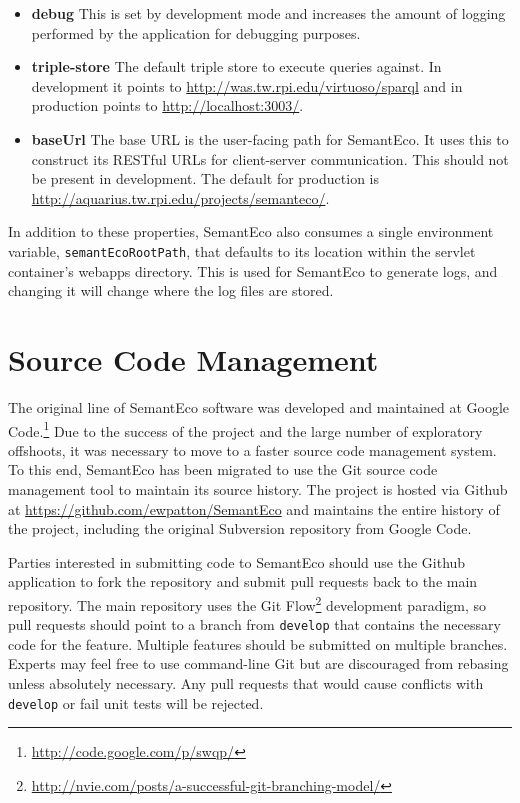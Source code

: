 \documentclass[letterpaper]{report}
\begin{document}
\begin{itemize}
\item \textbf{debug} This is set by development mode and increases the amount of logging performed by the application for debugging purposes.
\item \textbf{triple-store} The default triple store to execute queries against. In development it points to \url{http://was.tw.rpi.edu/virtuoso/sparql} and in production points to \url{http://localhost:3003/}.
\item \textbf{baseUrl} The base URL is the user-facing path for SemantEco. It uses this to construct its RESTful URLs for client-server communication. This should not be present in development. The default for production is \url{http://aquarius.tw.rpi.edu/projects/semanteco/}.
\end{itemize}

In addition to these properties, SemantEco also consumes a single environment variable, \texttt{semantEcoRootPath}, that defaults to its location within the servlet container's webapps directory. This is used for SemantEco to generate logs, and changing it will change where the log files are stored.

\chapter{Source Code Management}
The original line of SemantEco software was developed and maintained at Google Code.\footnote{\url{http://code.google.com/p/swqp/}} Due to the success of the project and the large number of exploratory offshoots, it was necessary to move to a faster source code management system. To this end, SemantEco has been migrated to use the Git source code management tool to maintain its source history. The project is hosted via Github at \url{https://github.com/ewpatton/SemantEco} and maintains the entire history of the project, including the original Subversion repository from Google Code.

Parties interested in submitting code to SemantEco should use the Github application to fork the repository and submit pull requests back to the main repository. The main repository uses the Git Flow\footnote{\url{http://nvie.com/posts/a-successful-git-branching-model/}} development paradigm, so pull requests should point to a branch from \texttt{develop} that contains the necessary code for the feature. Multiple features should be submitted on multiple branches. Experts may feel free to use command-line Git but are discouraged from rebasing unless absolutely necessary. Any pull requests that would cause conflicts with \texttt{develop} or fail unit tests will be rejected.

\renewcommand{\bibname}{References}


\end{document}
